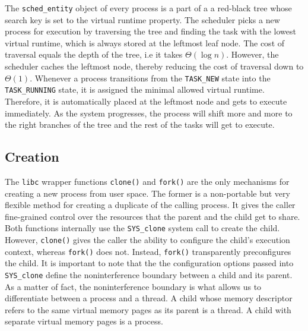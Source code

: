 The \verb|sched_entity| object of every process is a part of a 
a red-black tree whose search key is set to the virtual runtime property. The scheduler picks a new process 
for execution by traversing the tree and finding the task with the lowest virtual runtime, which is always 
stored at the leftmost leaf node. The cost of traversal equals the depth of the tree, i.e it takes $\Theta{(\log{n})}$.
However, the scheduler caches the leftmost node, thereby reducing the cost of traversal down to $\Theta{(1)}$.
Whenever a process transitions from the \verb|TASK_NEW| state into the \verb|TASK_RUNNING| state, 
it is assigned the minimal allowed virtual runtime. Therefore, it is automatically 
placed at the leftmost node and gets to execute immediately. As the system progresses, the process will
shift more and more to the right branches of the tree and the rest of the tasks will get to execute.

\subsection{Creation}
\label{ch:fundamentals/processes/creation}
The \verb|libc| wrapper functions \verb|clone()| and \verb|fork()| are the only mechanisms for 
creating a new process from user space. The former is a non-portable but very flexible method for creating a
duplicate of the calling process. It gives the caller fine-grained control over the resources that 
the parent and the child get to share. Both functions internally use the \verb|SYS_clone| system call 
to create the child. However, \verb|clone()| gives the caller the ability to configure the child's execution 
context, whereas \verb|fork()| does not. Instead, \verb|fork()| transparently preconfigures the child.
It is important to note that the the configuration options passed into \verb|SYS_clone| define 
the noninterference boundary between a child and its parent. As a matter of fact, the 
noninterference boundary is what allows us to differentiate between a process and a thread. 
A child whose memory descriptor refers to the same virtual memory pages as its parent is a thread. 
A child with separate virtual memory pages is a process. 
\clearpage

